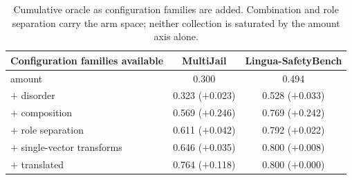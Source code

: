 \begin{table}[t]
\centering
\small
\caption{Cumulative oracle as configuration families are added. Combination and role separation carry the arm space; neither collection is saturated by the amount axis alone.}
\label{tab:sel_ablation}
\begin{tabular}{lcc}
\toprule
Configuration families available & MultiJail & Lingua-SafetyBench \\
\midrule
amount & 0.300 & 0.494 \\
$+$ disorder & 0.323 ($+$0.023) & 0.528 ($+$0.033) \\
$+$ composition & 0.569 ($+$0.246) & 0.769 ($+$0.242) \\
$+$ role separation & 0.611 ($+$0.042) & 0.792 ($+$0.022) \\
$+$ single-vector transforms & 0.646 ($+$0.035) & 0.800 ($+$0.008) \\
$+$ translated & 0.764 ($+$0.118) & 0.800 ($+$0.000) \\
\bottomrule
\end{tabular}
\end{table}
